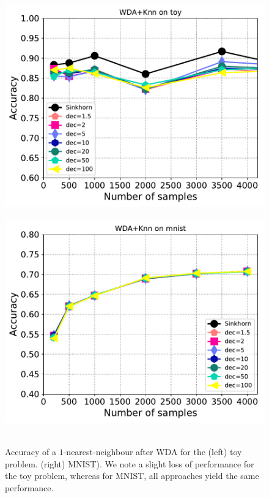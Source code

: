 \begin{figure}[t]
	\centering
	~\hfill~\includegraphics[width=6.cm]{./figs/wda_accur_toy.pdf}~\hfill~
	\includegraphics[width=6.cm]{./figs/wda_accur_mnist.pdf}~\hfill~\\
	\caption{Accuracy of a $1$-nearest-neighbour after WDA for the (left) toy problem.
		(right) MNIST). We note a slight loss of performance for the toy problem, whereas for MNIST, all approaches yield the same performance. 
		\label{fig:wda_gain}}
\end{figure}



